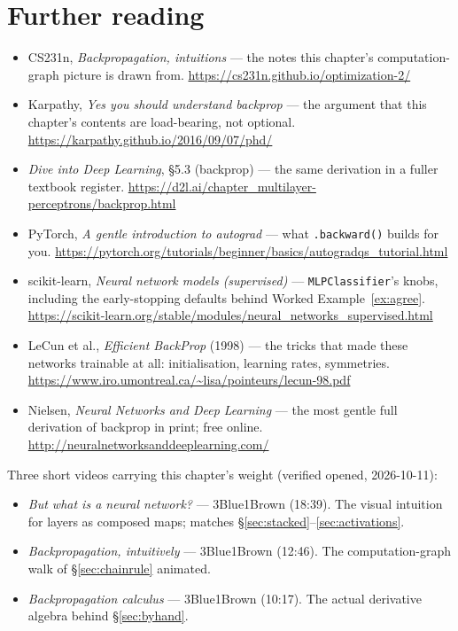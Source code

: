 \section*{Further reading}
\begin{itemize}
\item CS231n, \emph{Backpropagation, intuitions} --- the notes this
chapter's computation-graph picture is drawn from.
\url{https://cs231n.github.io/optimization-2/}
\item Karpathy, \emph{Yes you should understand backprop} --- the
argument that this chapter's contents are load-bearing, not optional.
\url{https://karpathy.github.io/2016/09/07/phd/}
\item \emph{Dive into Deep Learning}, \S5.3 (backprop) --- the same
derivation in a fuller textbook register.
\url{https://d2l.ai/chapter_multilayer-perceptrons/backprop.html}
\item PyTorch, \emph{A gentle introduction to autograd} --- what
\texttt{.backward()} builds for you.
\url{https://pytorch.org/tutorials/beginner/basics/autogradqs_tutorial.html}
\item scikit-learn, \emph{Neural network models (supervised)} ---
\texttt{MLPClassifier}'s knobs, including the early-stopping defaults
behind Worked Example~\ref{ex:agree}.
\url{https://scikit-learn.org/stable/modules/neural_networks_supervised.html}
\item LeCun et al., \emph{Efficient BackProp} (1998) --- the tricks that
made these networks trainable at all: initialisation, learning rates,
symmetries.
\url{https://www.iro.umontreal.ca/~lisa/pointeurs/lecun-98.pdf}
\item Nielsen, \emph{Neural Networks and Deep Learning} --- the most
gentle full derivation of backprop in print; free online.
\url{http://neuralnetworksanddeeplearning.com/}
\end{itemize}

\begin{rulebox}
Three short videos carrying this chapter's weight (verified opened,
2026-10-11):
\begin{itemize}
\item \emph{But what is a neural network?} --- 3Blue1Brown (18:39). The
visual intuition for layers as composed maps; matches
\S\ref{sec:stacked}--\ref{sec:activations}.
\item \emph{Backpropagation, intuitively} --- 3Blue1Brown (12:46). The
computation-graph walk of \S\ref{sec:chainrule} animated.
\item \emph{Backpropagation calculus} --- 3Blue1Brown (10:17). The
actual derivative algebra behind \S\ref{sec:byhand}.
\end{itemize}
\end{rulebox}

